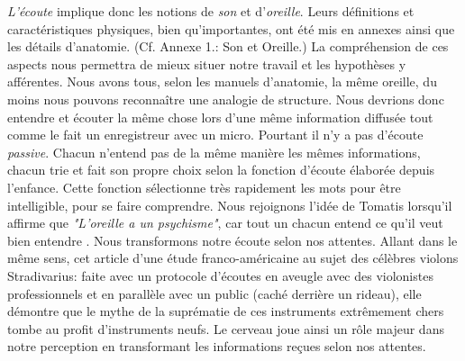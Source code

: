 \emph{L'écoute} implique donc les notions de \emph{son} et
d'\emph{oreille}. Leurs définitions et caractéristiques physiques, bien qu'importantes, ont été mis en
annexes ainsi que les détails
d'anatomie. (Cf. Annexe 1.: Son et Oreille.)
La compréhension de ces aspects nous
permettra de mieux situer notre travail et les hypothèses y afférentes.
Nous avons tous,
selon les manuels d'anatomie, la même
oreille, du moins nous pouvons reconnaître une analogie de structure. Nous devrions donc entendre et écouter la même chose
lors d'une même information diffusée tout comme le fait un enregistreur avec un micro. Pourtant il n'y a pas d'écoute \emph{passive}. Chacun n'entend pas de la même manière les mêmes
informations, chacun trie et fait son propre choix selon la fonction
d'écoute élaborée depuis l'enfance. Cette fonction sélectionne très
rapidement les mots pour être intelligible, pour se faire
comprendre. Nous rejoignons l'idée de Tomatis lorsqu'il affirme que
\textit{"L'oreille a un psychisme"}, car tout un chacun entend ce qu'il veut bien
entendre \autocite [167]{tomatis_oreille_1987}.
Nous transformons notre écoute selon nos attentes.
Allant dans le même sens, cet
article d'une
étude franco-américaine \autocite{lemonde.fr:stradivarius} au sujet des célèbres violons
Stradivarius: faite avec un protocole
d'écoutes en aveugle avec
des violonistes professionnels et en parallèle avec un public (caché
derrière un rideau), elle démontre que le mythe de la suprématie
de ces instruments extrêmement chers tombe au profit d'instruments
neufs. Le cerveau  joue ainsi un
rôle majeur dans notre perception en 
transformant les informations reçues selon nos attentes.
%
